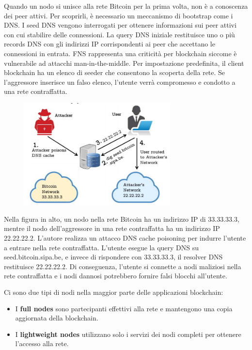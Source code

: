 Quando un nodo si unisce alla rete Bitcoin per la prima volta, non è a conoscenza dei peer attivi. Per scoprirli, è necessario un meccanismo di bootstrap come i DNS. I seed DNS vengono interrogati per ottenere informazioni sui peer attivi con cui stabilire delle connessioni. La query DNS iniziale restituisce uno o più records DNS con gli indirizzi IP corrispondenti ai peer che accettano le connessioni in entrata. FNS rappresenta una criticità per blockchain siccome è vulnerabile ad attacchi man-in-the-middle. Per impostazione predefinita, il client blockchain ha un elenco di seeder che consentono la scoperta della rete. Se l'aggressore inserisce un falso elenco, l'utente verrà compromesso e condotto a una rete contraffatta.

\begin{figure}[htb!]
    \centering
    \includegraphics[width=8cm]{./Images/cap5/5.4.png}
\end{figure}

Nella figura in alto, un nodo nella rete Bitcoin ha un indirizzo IP di 33.33.33.3, mentre il nodo dell'aggressore in una rete contraffatta ha un indirizzo IP 22.22.22.2. L'autore realizza un attacco DNS cache poisoning per indurre l'utente a entrare nella rete contraffatta. L'utente esegue la query DNS su seed.bitcoin.sipa.be, e invece di rispondere con 33.33.33.3, il resolver DNS restituisce 22.22.22.2. Di conseguenza, l'utente si connette a nodi maliziosi nella rete contraffatta e i nodi dannosi potrebbero fornire falsi blocchi all'utente.

Ci sono due tipi di nodi nella maggior parte delle applicazioni blockchain:
\begin{itemize}
    \item I \textbf{full nodes} sono partecipanti effettivi alla rete e mantengono una copia aggiornata della blockchain.
    \item I \textbf{lightweight nodes} utilizzano solo i servizi dei nodi completi per ottenere l'accesso alla rete.
\end{itemize}

